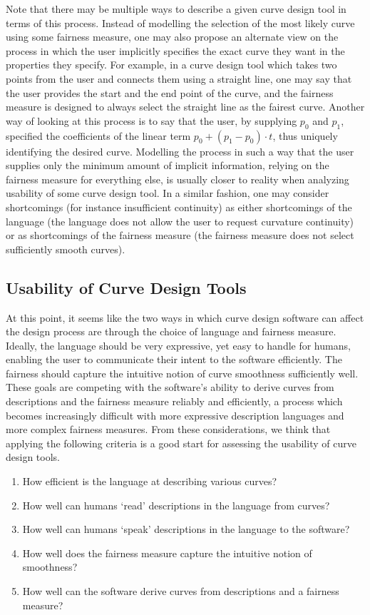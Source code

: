 \documentclass[a4paper]{article}
\begin{document}
			Note that there may be multiple ways to describe a given curve design tool in terms of this process. Instead of modelling the selection of the most likely curve using some fairness measure, one may also propose an alternate view on the process in which the user implicitly specifies the exact curve they want in the properties they specify. For example, in a curve design tool which takes two points from the user and connects them using a straight line, one may say that the user provides the start and the end point of the curve, and the fairness measure is designed to always select the straight line as the fairest curve. Another way of looking at this process is to say that the user, by supplying \(p_0\) and \(p_1\), specified the coefficients of the linear term \(p_0 + (p_1 - p_0) \cdot t\), thus uniquely identifying the desired curve. Modelling the process in such a way that the user supplies only the minimum amount of implicit information, relying on the fairness measure for everything else, is usually closer to reality when analyzing usability of some curve design tool. In a similar fashion, one may consider shortcomings (for instance insufficient continuity) as either shortcomings of the language (the language does not allow the user to request curvature continuity) or as shortcomings of the fairness measure (the fairness measure does not select sufficiently smooth curves).

		\subsection{Usability of Curve Design Tools}
		\label{section:usability_curve_design_tools}

			At this point, it seems like the two ways in which curve design software can affect the design process are through the choice of language and fairness measure. Ideally, the language should be very expressive, yet easy to handle for humans, enabling the user to communicate their intent to the software efficiently. The fairness should capture the intuitive notion of curve smoothness sufficiently well. These goals are competing with the software's ability to derive curves from descriptions and the fairness measure reliably and efficiently, a process which becomes increasingly difficult with more expressive description languages and more complex fairness measures. From these considerations, we think that applying the following criteria is a good start for assessing the usability of curve design tools.

			\begin{enumerate}
				\item How efficient is the language at describing various curves?
				\item How well can humans `read' descriptions in the language from curves?
				\item How well can humans `speak' descriptions in the language to the software?
				\item How well does the fairness measure capture the intuitive notion of smoothness?
				\item How well can the software derive curves from descriptions and a fairness measure?
			\end{enumerate}
\end{document}
